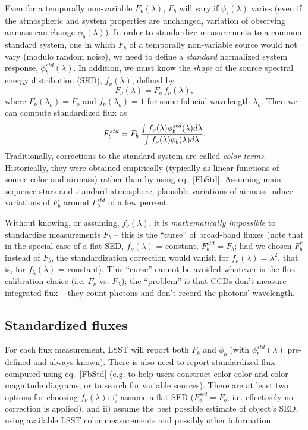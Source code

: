 \documentclass{emulateapj}
\begin{document}
Even for a temporally non-variable $F_\nu(\lambda)$,  $F_b$ will vary if 
$\phi_b(\lambda)$ varies (even if the atmospheric and system properties
are unchanged, variation of observing airmass can change $\phi_b(\lambda)$). 
In order to standardize measurements to a 
common standard system, one in which $F_b$ of a temporally non-variable 
source would not vary (modulo random noise),  we need to define a {\it standard}
normalized system response, $\phi^{std}_b(\lambda)$. In addition, we must know the {\it shape} 
of the source spectral energy distribution (SED), $f_\nu(\lambda)$, defined by 
\begin{equation}
        F_\nu(\lambda) = F_o \, f_\nu(\lambda),
\end{equation} 
where $F_\nu(\lambda_o) = F_o$ and $f_\nu(\lambda_o) = 1$ for some fiducial 
wavelength $\lambda_o$. Then we can compute standardized flux as 
\begin{equation}
\label{FbStd}
F^{std}_b =  F_b \, {\int{f_\nu(\lambda)  \phi^{std}_b(\lambda) d\lambda }  \over   \int{ f_\nu(\lambda) \phi_b(\lambda) d\lambda }}. 
\end{equation}
Traditionally, corrections to the standard system are called {\it color terms}. Historically,
they were obtained empirically (typically as linear functions of source color and airmass)
rather than by using eq.~\ref{FbStd}. Assuming main-sequence stars and standard atmosphere, 
plausible variations of airmass induce variations of $F_b$ around $F^{std}_b$ of a few percent. 

Without knowing, or assuming, $f_\nu(\lambda)$, it is {\it mathematically impossible}  to 
standardize measurements $F_b$ -- this is the ``curse'' of broad-band fluxes
(note that in the special case of a flat SED, $f_\nu(\lambda)$ = constant, $F^{std}_b =  F_b$;
had we chosen $F_b^\ast$ instead of $F_b$, the standardization correction would vanish for
$f_\nu(\lambda) = \lambda^2$, that is, for $f_\lambda(\lambda)$ = constant). 
This ``curse'' cannot be avoided whatever is the flux calibration choice (i.e. $F_\nu$ vs. $F_\lambda$);
the ``problem'' is that CCDs don't measure integrated flux -- they count photons and
don't record the photons' wavelength.


\subsection{Standardized fluxes} 
 
For each flux measurement, LSST will report both $F_b$ and $\phi_b$ (with $\phi^{std}_b(\lambda)$ 
pre-defined and always known). There is also need to report standardized flux
computed using eq.~\ref{FbStd} (e.g. to help users construct color-color and color-magnitude
diagrams, or to search for variable sources). There are at least two options for choosing $f_\nu(\lambda)$:
i) assume a flat SED ($F^{std}_b =  F_b$, i.e. effectively no correction is applied), and ii) assume 
the best possible estimate of object's SED, using available LSST color measurements and possibly 
other information. 
\end{document}
